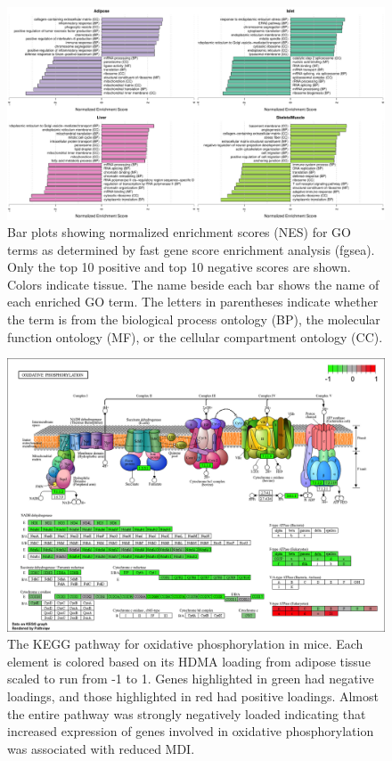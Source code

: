 \documentclass[
]{article}
\begin{document}
\begin{figure}[ht!]
\includegraphics[width=\textwidth]{Figures/Supp_Fig_enrichments_GO.pdf} 
\caption{Bar plots showing normalized enrichment scores (NES) for GO 
terms as determined by fast gene score enrichment analysis (fgsea). 
Only the top 10 positive and top 10 negative scores are shown. Colors 
indicate tissue. The name beside each bar shows the name of each enriched 
GO term. The letters in parentheses indicate whether the term is from the 
biological process ontology (BP), the molecular function ontology (MF), 
or the cellular compartment ontology (CC).
}
\label{fig:top_enrich_go}
\end{figure}

\begin{figure}[ht!]
\includegraphics[width=\textwidth]{Figures/Supp_Fig_OxPhos.png} 
\caption{The KEGG pathway for oxidative phosphorylation in 
mice. Each element is colored based on its HDMA loading from adipose
tissue scaled to run from -1 to 1. Genes highlighted in green had 
negative loadings, and those highlighted in red had positive loadings. 
Almost the entire pathway was strongly negatively loaded indicating 
that increased expression of genes involved in oxidative phosphorylation
was associated with reduced MDI.
}
\label{fig:oxPhos}
\end{figure}
\end{document}

